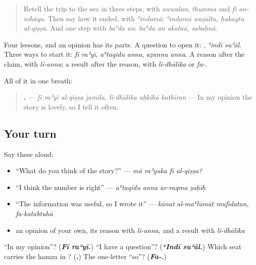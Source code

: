 \label{lesson:AR-R285-opinion-and-so}



\begin{quote}
Retell the trip to the sea in three steps, with \emph{awwalan}, \emph{thumma} and \emph{fī an-nihāya}. Then say how it ended, with \emph{ʿindamā}: \emph{ʿindamā waṣaltu, ḥakaytu al-qiṣṣa}. And one step with \emph{baʿda an}: \emph{baʿda an akalnā, sabaḥnā}.
\end{quote}

\begin{grammarlens}[title={What you've built}]
Four lessons, and an opinion has its parts. A question to open it: \textbf{ }, \emph{ʿindī suʾāl}. Three ways to start it: \emph{fī raʾyī}, \emph{aʿtaqidu anna}, \emph{aẓunnu anna}. A reason after the claim, with \emph{li-anna}; a result after the reason, with \emph{li-dhālika} or \emph{fa-}.

All of it in one breath:

\begin{quote}
\textbf{      .} — \emph{fī raʾyī al-qiṣṣa jamīla, li-dhālika aḥkīhā kathīran} — In my opinion the story is lovely, so I tell it often.
\end{quote}
\end{grammarlens}

\subsection*{Your turn}
Say these aloud:

\begin{itemize}
\raggedright
  \item \textquotedblleft{}What do you think of the story?\textquotedblright{} — \emph{mā raʾyuka fī al-qiṣṣa?}
  \item \textquotedblleft{}I think the number is right\textquotedblright{} — \emph{aʿtaqidu anna ar-raqma ṣaḥīḥ}
  \item \textquotedblleft{}The information was useful, so I wrote it\textquotedblright{} — \emph{kānat al-maʿlūmāt mufīdatan, fa-katabtuhā}
  \item an opinion of your own, its reason with \emph{li-anna}, and a result with \emph{li-dhālika}
\end{itemize}

\begin{tcolorbox}[breakable,colback=teal!4,colframe=teal!35!black,title={Before you move on}]
\textquotedblleft{}In my opinion\textquotedblright{}? (\emph{\textbf{Fī raʾyī.}}) \textquotedblleft{}I have a question\textquotedblright{}? (\emph{\textbf{ʿIndī suʾāl.}}) Which seat carries the hamza in \textbf{}? (\textbf{.}) The one-letter \textquotedblleft{}so\textquotedblright{}? (\emph{\textbf{Fa-.}})
\end{tcolorbox}
